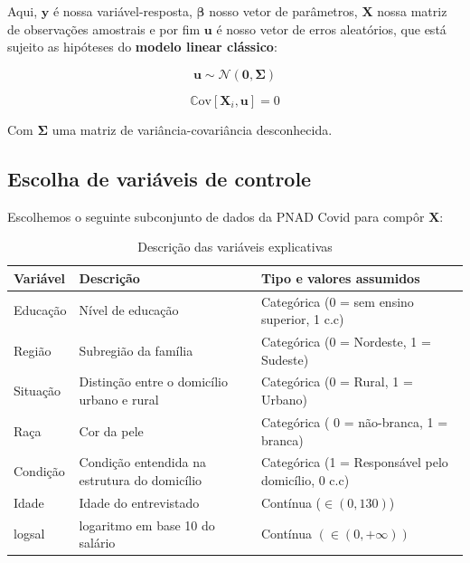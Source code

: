 \documentclass[paper=a4wide, fontsize=10pt]{scrartcl}	 %
\newcommand{\Cova}[1]{\mathbb{C}\text{ov}[#1]}
\begin{document}
    Aqui, \(\mathbf{y}\) é nossa variável-resposta, \(\boldsymbol{\beta}\) nosso vetor de parâmetros, \(\mathbf{X}\) nossa matriz de observações amostrais e por fim \(\mathbf{u}\) é nosso vetor de erros aleatórios, que está sujeito as hipóteses do \textbf{modelo linear clássico}:

    \begin{equation}\label{MLC}
        \mathbf{u} \sim \boldsymbol{\mathcal{N}}(\mathbf{0},\boldsymbol{\Sigma})
    \end{equation}

    \begin{equation}\label{COV}
        \Cova{\mathbf{X}_i,\mathbf{u}} = 0
    \end{equation}

    Com \(\boldsymbol{\Sigma}\) uma matriz de variância-covariância desconhecida.
    
    \subsection{Escolha de variáveis de controle}

    Escolhemos o seguinte subconjunto de dados da PNAD Covid para compôr \(\mathbf{X}\):

    \begin{table}[ht]
\centering
\begin{tabular}{@{}lll@{}}
\toprule
Variável     & Descrição                          & Tipo e valores assumidos \\ \midrule
Educação         & Nível de educação                  & Categórica (0 = sem ensino superior, 1 c.c)         \\
Região         & Subregião da família                  & Categórica (0 = Nordeste, 1 = Sudeste)          \\
Situação         & Distinção entre o domicílio urbano e rural                  & Categórica (0 = Rural, 1 = Urbano)               \\
Raça         & Cor da pele                  & Categórica ( 0 = não-branca, 1 = branca)           \\
Condição         & Condição entendida na estrutura do domicílio                  & Categórica (1 = Responsável pelo domicílio, 0 c.c) \\
Idade         & Idade do entrevistado                  & Contínua (\(\in (0,130)\))      \\
logsal         & logaritmo em base 10 do salário                  & Contínua \((\in(0,+\infty))\)            \\
 \bottomrule
\end{tabular}
\caption{Descrição das variáveis explicativas}
\label{tab:minha_tabela}
\end{table}
\end{document}

